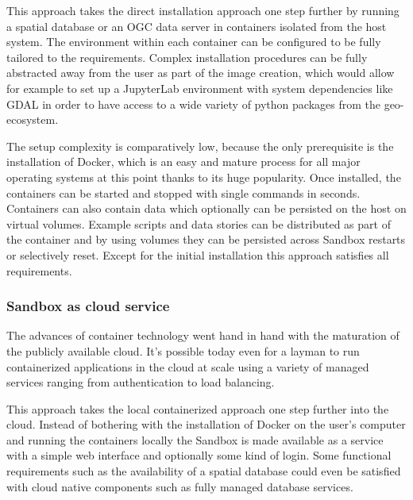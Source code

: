 \documentclass[11pt, a4paper, oneside, parskip=full-]{scrartcl}
\begin{document}
This approach takes the direct installation approach one step further by running
a spatial database or an OGC data server in containers isolated from the host
system. The environment within each container can be configured to be fully
tailored to the requirements. Complex installation procedures can be fully
abstracted away from the user as part of the image creation, which would allow
for example to set up a JupyterLab environment with system dependencies like
GDAL in order to have access to a wide variety of python packages from the
geo-ecosystem.

The setup complexity is comparatively low, because the only prerequisite is the
installation of Docker, which is an easy and mature process for all major
operating systems at this point thanks to its huge popularity. Once installed,
the containers can be started and stopped with single commands in seconds.
Containers can also contain data which optionally can be persisted on the host
on virtual volumes. Example scripts and data stories can be distributed as part
of the container and by using volumes they can be persisted across Sandbox
restarts or selectively reset. Except for the initial installation this approach
satisfies all requirements.

\subsubsection*{Sandbox as cloud service}
The advances of container technology went hand in hand with the maturation of
the publicly available cloud. It's possible today even for a layman to run
containerized applications in the cloud at scale using a variety of managed
services ranging from authentication to load balancing.

This approach takes the local containerized approach one step further into the
cloud. Instead of bothering with the installation of Docker on the user's
computer and running the containers locally the Sandbox is made available as a
service with a simple web interface and optionally some kind of login. Some
functional requirements such as the availability of a spatial database could
even be satisfied with cloud native components such as fully managed database
services.
\end{document}
